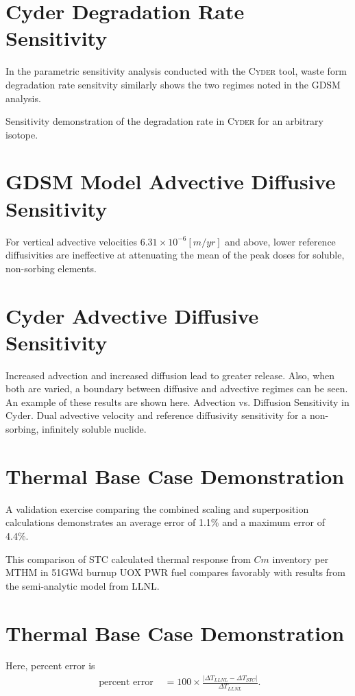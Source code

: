 \documentclass[letterpaper]{article}
\newcommand{\Cyder}{\textsc{Cyder}\xspace}
\begin{document}
{\section{Cyder Degradation Rate Sensitivity}
In the parametric sensitivity analysis conducted with the \Cyder tool, waste 
form degradation rate sensitvity similarly shows the two regimes noted in the 
GDSM analysis.  

Sensitivity demonstration of the degradation rate in \Cyder for an 
arbitrary isotope.


\section{GDSM Model Advective Diffusive Sensitivity}
For vertical advective velocities 
$6.31\times10^{-6}[m/yr]$ and above, lower reference diffusivities are 
ineffective at attenuating the mean of the peak doses for soluble, non-sorbing 
elements. 

\section{Cyder Advective Diffusive Sensitivity}
Increased advection and increased diffusion lead to greater release. Also, when 
both are varied, a boundary between diffusive and advective
regimes can be seen. An example of these results are shown here.
Advection vs. Diffusion Sensitivity in Cyder. Dual advective velocity 
and reference diffusivity sensitivity for a non-sorbing, infinitely soluble 
nuclide.

  \section{Thermal Base Case Demonstration}
A validation exercise comparing the combined scaling and  
superposition calculations demonstrates an average error of 1.1\% and a 
maximum error of 4.4\%.

This comparison of STC calculated thermal response from $Cm$ 
inventory per MTHM in 51GWd burnup UOX PWR fuel compares favorably with results 
from the semi-analytic model from LLNL.


  \section{Thermal Base Case Demonstration}
Here, percent error is 
\begin{align}
\mbox{ percent error } &= 100\times\frac{\left|\Delta T_{LLNL} - \Delta 
T_{STC}\right|}{ \Delta T_{LLNL}}.
\end{align}

}
\end{document}
